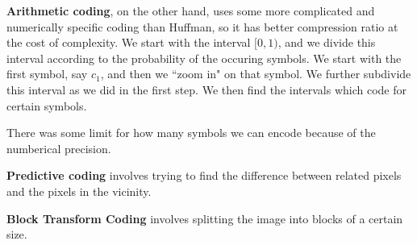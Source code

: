 \documentclass{tufte-handout}
\begin{document}
\textbf{Arithmetic coding}, on the other hand, uses some more complicated and numerically
specific coding than Huffman, so it has better compression ratio at the cost of complexity.
We start with the interval $[0, 1)$, and we divide this interval according to the probability
of the occuring symbols. We start with the first symbol, say $c_{1}$, and then we ``zoom in"
on that symbol. We further subdivide this interval as we did in the first step. We then 
find the intervals which code for certain symbols.

There was some limit for how many symbols we can encode because of the numberical precision.

\textbf{Predictive coding} involves trying to find the difference between related pixels and 
the pixels in the vicinity.

\textbf{Block Transform Coding} involves splitting the image into blocks of a certain size.
\end{document}
